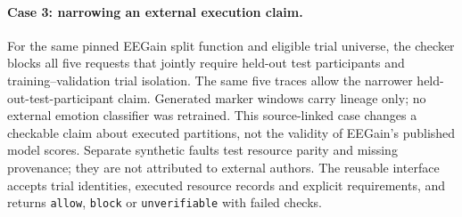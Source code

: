 \paragraph{Case 3: narrowing an external execution claim.}
For the same pinned EEGain split function and eligible trial universe, the
checker blocks all five requests that jointly require held-out test
participants and training--validation trial isolation. The same five traces
allow the narrower held-out-test-participant claim. Generated marker windows
carry lineage only; no external emotion classifier was retrained. This
source-linked case changes a checkable claim about executed partitions, not
the validity of EEGain's published model scores. Separate synthetic faults
test resource parity and missing provenance; they are not attributed to
external authors. The reusable interface accepts trial identities, executed
resource records and explicit requirements, and returns \texttt{allow},
\texttt{block} or \texttt{unverifiable} with failed checks.
